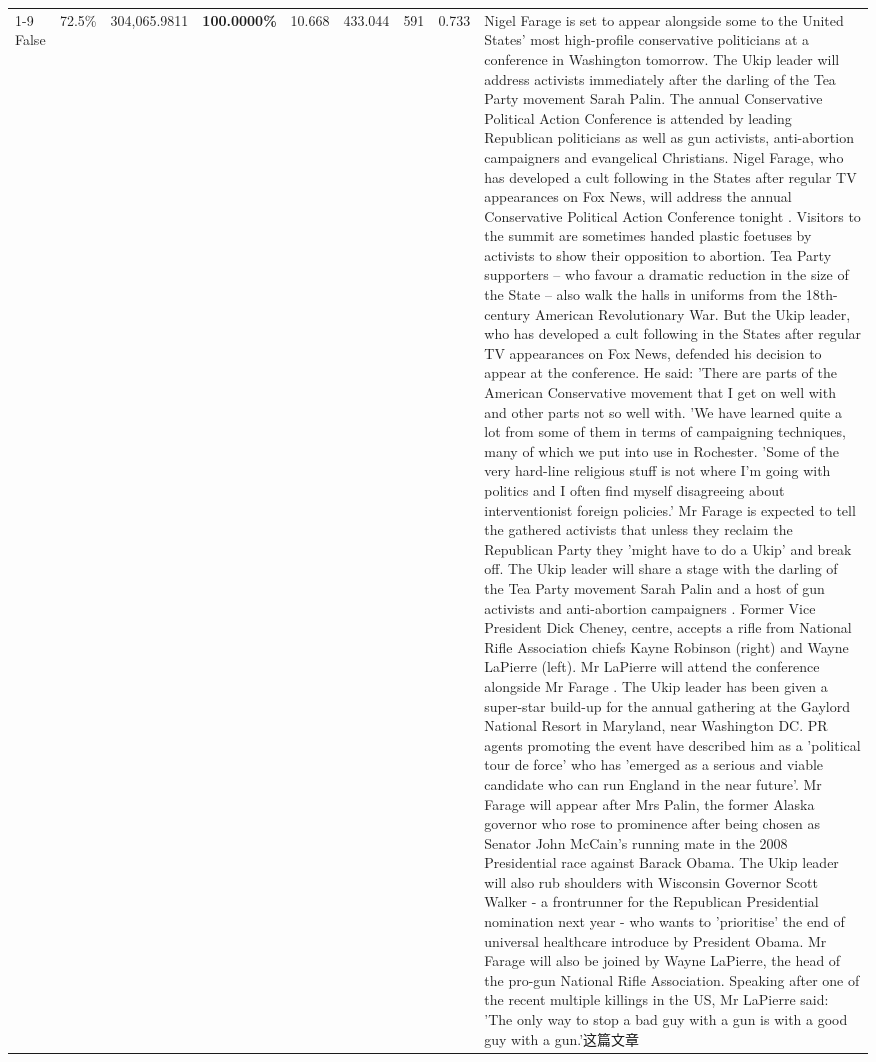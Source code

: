 \begin{table}[H]
\begin{tabular}{lllrlllll}
\cline{1-9}
False & 72.5\% & 304,065.9811 & \bfseries \color{red} 100.0000\% & 10.668 & 433.044 & 591 & 0.733 & Nigel Farage is set to appear alongside some to the United States' most high-profile conservative politicians at a conference in Washington tomorrow. The Ukip leader will address activists immediately after the darling of the Tea Party movement Sarah Palin. The annual Conservative Political Action Conference is attended by leading Republican politicians as well as gun activists, anti-abortion campaigners and evangelical Christians. Nigel Farage, who has developed a cult following in the States after regular TV appearances on Fox News, will address the annual Conservative Political Action Conference tonight . Visitors to the summit are sometimes handed plastic foetuses by activists to show their opposition to abortion. Tea Party supporters – who favour a dramatic reduction in the size of the State – also walk the halls in uniforms from the 18th-century American Revolutionary War. But the Ukip leader, who has developed a cult following in the States after regular TV appearances on Fox News, defended his decision to appear at the conference. He said: 'There are parts of the American Conservative movement that I get on well with and other parts not so well with. 'We have learned quite a lot from some of them in terms of campaigning techniques, many of which we put into use in Rochester. 'Some of the very hard-line religious stuff is not where I'm going with politics and I often find myself disagreeing about interventionist foreign policies.' Mr Farage is expected to tell the gathered activists that unless they reclaim the Republican Party they 'might have to do a Ukip' and break off. The Ukip leader will share a stage with the darling of the Tea Party movement Sarah Palin and a host of gun activists and anti-abortion campaigners . Former Vice President Dick Cheney, centre, accepts a rifle from National Rifle Association chiefs Kayne Robinson (right) and Wayne LaPierre (left). Mr LaPierre will attend the conference alongside Mr Farage . The Ukip leader has been given a super-star build-up for the annual gathering at the Gaylord National Resort in Maryland, near Washington DC. PR agents promoting the event have described him as a 'political tour de force' who has 'emerged as a serious and viable candidate who can run England in the near future'. Mr Farage will appear after Mrs Palin, the former Alaska governor who rose to prominence after being chosen as Senator John McCain's running mate in the 2008 Presidential race against Barack Obama. The Ukip leader will also rub shoulders with Wisconsin Governor Scott Walker - a frontrunner for the Republican Presidential nomination next year - who wants to 'prioritise' the end of universal healthcare introduce by President Obama. Mr Farage will also be joined by Wayne LaPierre, the head of the pro-gun National Rifle Association. Speaking after one of the recent multiple killings in the US, Mr LaPierre said: 'The only way to stop a bad guy with a gun is with a good guy with a gun.'这篇文章 \\

\end{tabular}
\end{table}
